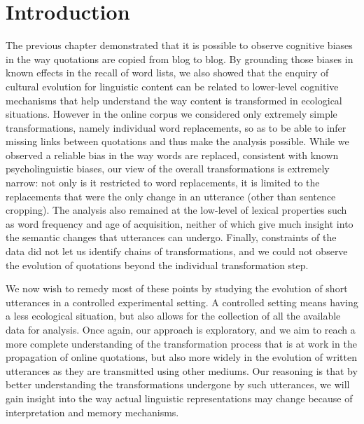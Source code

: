 \section{Introduction}\label{sec:gistr-intro}

The previous chapter demonstrated that it is possible to observe
cognitive biases in the way quotations are copied from blog to blog. By
grounding those biases in known effects in the recall of word lists, we
also showed that the enquiry of cultural evolution for linguistic
content can be related to lower-level cognitive mechanisms that help
understand the way content is transformed in ecological situations.
However in the online corpus we considered only extremely simple
transformations, namely individual word replacements, so as to be able
to infer missing links between quotations and thus make the analysis
possible. While we observed a reliable bias in the way words are
replaced, consistent with known psycholinguistic biases, our view of the
overall transformations is extremely narrow: not only is it restricted
to word replacements, it is limited to the replacements that were the
only change in an utterance (other than sentence cropping). The analysis
also remained at the low-level of lexical properties such as word
frequency and age of acquisition, neither of which give much insight
into the semantic changes that utterances can undergo. Finally,
constraints of the data did not let us identify chains of
transformations, and we could not observe the evolution of quotations
beyond the individual transformation step.

We now wish to remedy most of these points by studying the evolution of
short utterances in a controlled experimental setting. A controlled
setting means having a less ecological situation, but also allows for
the collection of all the available data for analysis. Once again, our
approach is exploratory, and we aim to reach a more complete
understanding of the transformation process that is at work in the
propagation of online quotations, but also more widely in the evolution
of written utterances as they are transmitted using other mediums. Our
reasoning is that by better understanding the transformations undergone
by such utterances, we will gain insight into the way actual linguistic
representations may change because of interpretation and memory
mechanisms.

